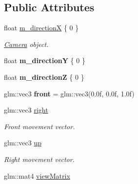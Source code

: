\subsection*{Public Attributes}
\begin{DoxyCompactItemize}
\item 
float \hyperlink{class_camera_component_a7a95ace18cee6a6b88ac5873233e2cc3}{m\+\_\+direction\+X} \{ 0 \}
\begin{DoxyCompactList}\small\item\em \hyperlink{class_camera}{Camera} object. \end{DoxyCompactList}\item 
\hypertarget{class_camera_component_a89b5e6d77f8def9bdcdda71be27cd83f}{float {\bfseries m\+\_\+direction\+Y} \{ 0 \}}\label{class_camera_component_a89b5e6d77f8def9bdcdda71be27cd83f}

\item 
\hypertarget{class_camera_component_abfe4cac0ee5fc5768bdedada791b925e}{float {\bfseries m\+\_\+direction\+Z} \{ 0 \}}\label{class_camera_component_abfe4cac0ee5fc5768bdedada791b925e}

\item 
\hypertarget{class_camera_component_a3cc09f3e499de24e429ad2ad30b6ff43}{glm\+::vec3 {\bfseries front} = glm\+::vec3(0.\+0f, 0.\+0f, 1.\+0f)}\label{class_camera_component_a3cc09f3e499de24e429ad2ad30b6ff43}

\item 
\hypertarget{class_camera_component_a62040ca115beaa48627fe56d330647c0}{glm\+::vec3 \hyperlink{class_camera_component_a62040ca115beaa48627fe56d330647c0}{right}}\label{class_camera_component_a62040ca115beaa48627fe56d330647c0}

\begin{DoxyCompactList}\small\item\em Front movement vector. \end{DoxyCompactList}\item 
\hypertarget{class_camera_component_a639f14e0057198d84ed8de71c3df3303}{glm\+::vec3 \hyperlink{class_camera_component_a639f14e0057198d84ed8de71c3df3303}{up}}\label{class_camera_component_a639f14e0057198d84ed8de71c3df3303}

\begin{DoxyCompactList}\small\item\em Right movement vector. \end{DoxyCompactList}\item 
\hypertarget{class_camera_component_aa9ba12dfc1a9b7b06bf79fdb0a91a3e2}{glm\+::mat4 \hyperlink{class_camera_component_aa9ba12dfc1a9b7b06bf79fdb0a91a3e2}{view\+Matrix}}\label{class_camera_component_aa9ba12dfc1a9b7b06bf79fdb0a91a3e2}


\end{DoxyCompactItemize}
